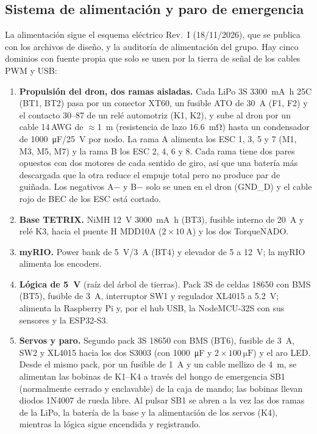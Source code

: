 \subsection{Sistema de alimentación y paro de emergencia}
\label{sec:power}
La alimentación sigue el esquema eléctrico Rev.~I (18/11/2026), que se publica con los archivos de diseño, y la auditoría de alimentación del grupo. Hay cinco dominios con fuente propia que solo se unen por la tierra de señal de los cables PWM y USB:
\begin{enumerate}[label=\textbf{S\arabic*.}]
  \item \textbf{Propulsión del dron, dos ramas aisladas.} Cada LiPo 3S \SI{3300}{\milli\ampere\hour} 25C (BT1, BT2) pasa por un conector XT60, un fusible ATO de \SI{30}{\ampere} (F1, F2) y el contacto 30--87 de un relé automotriz (K1, K2), y sube al dron por un cable 14\,AWG de $\approx$\SI{1}{\metre} (resistencia de lazo \SI{16.6}{\milli\ohm}) hasta un condensador de \SI{1000}{\micro\farad}/\SI{25}{\volt} por nodo. La rama A alimenta los ESC 1, 3, 5 y 7 (M1, M3, M5, M7) y la rama B los ESC 2, 4, 6 y 8. Cada rama tiene dos pares opuestos con dos motores de cada sentido de giro, así que una batería más descargada que la otra reduce el empuje total pero no produce par de guiñada. Los negativos A$-$ y B$-$ solo se unen en el dron (GND\_D) y el cable rojo de BEC de los ESC está cortado.
  \item \textbf{Base TETRIX.} NiMH \SI{12}{\volt} \SI{3000}{\milli\ampere\hour} (BT3), fusible interno de \SI{20}{\ampere} y relé K3, hacia el puente H MDD10A ($2\times\SI{10}{\ampere}$) y los dos TorqueNADO.
  \item \textbf{myRIO.} Power bank de \SI{5}{\volt}/\SI{3}{\ampere} (BT4) y elevador de 5 a \SI{12}{\volt}; la myRIO alimenta los encoders.
  \item \textbf{Lógica de \SI{5}{\volt}} (raíz del árbol de tierras). Pack 3S de celdas 18650 con BMS (BT5), fusible de \SI{3}{\ampere}, interruptor SW1 y regulador XL4015 a \SI{5.2}{\volt}; alimenta la Raspberry Pi y, por el hub USB, la NodeMCU-32S con sus sensores y la ESP32-S3.
  \item \textbf{Servos y paro.} Segundo pack 3S 18650 con BMS (BT6), fusible de \SI{3}{\ampere}, SW2 y XL4015 hacia los dos S3003 (con \SI{1000}{\micro\farad} y $2\times\SI{100}{\micro\farad}$) y el aro LED. Desde el mismo pack, por un fusible de \SI{1}{\ampere} y un cable mellizo de \SI{4}{\metre}, se alimentan las bobinas de K1--K4 a través del hongo de emergencia SB1 (normalmente cerrado y enclavable) de la caja de mando; las bobinas llevan diodos 1N4007 de rueda libre. Al pulsar SB1 se abren a la vez las dos ramas de la LiPo, la batería de la base y la alimentación de los servos (K4), mientras la lógica sigue encendida y registrando.
\end{enumerate}
